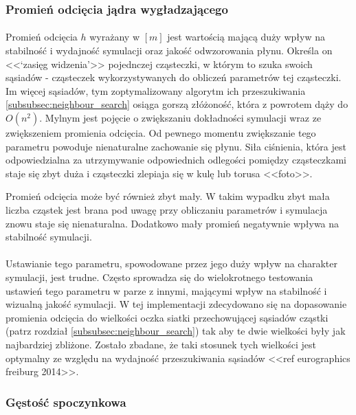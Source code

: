 \subsubsection{Promień odcięcia jądra wygładzającego}

\paragraph{}
Promień odcięcia $h$ wyrażany w $[m]$ jest wartością mającą duży wpływ na stabilność i wydajność symulacji oraz jakość odwzorowania płynu. Określa on <<`zasięg widzenia'>> pojednczej cząsteczki, w którym to szuka swoich sąsiadów - cząsteczek wykorzystywanych do obliczeń parametrów tej cząsteczki. Im więcej sąsiadów, tym zoptymalizowany algorytm ich przeszukiwania \eqref{subsubsec:neighbour_search} osiąga gorszą złóżoność, która z powrotem dąży do $O(n^2)$. Mylnym jest pojęcie o zwiększaniu dokładności symulacji wraz ze zwiększeniem promienia odcięcia. Od pewnego momentu zwiększanie tego parametru powoduje nienaturalne zachowanie się płynu. Siła ciśnienia, która jest odpowiedzialna za utrzymywanie odpowiednich odlegości pomiędzy cząsteczkami staje się zbyt duża i cząsteczki zlepiaja się w kulę lub torusa <<foto>>.
\par Promień odcięcia może być również zbyt mały. W takim wypadku zbyt mała liczba cząstek jest brana pod uwagę przy obliczaniu parametrów i symulacja znowu staje się nienaturalna. Dodatkowo mały promień negatywnie wpływa na stabilność symulacji.
\par
\paragraph{}
Ustawianie tego parametru, spowodowane przez jego duży wpływ na charakter symulacji, jest trudne. Często sprowadza się do wielokrotnego testowania ustawień tego parametru w parze z innymi, mającymi wpływ na stabilność i wizualną jakość symulacji. W tej implementacji zdecydowano się na dopasowanie promienia odcięcia do wielkości oczka siatki przechowującej sąsiadów cząstki (patrz rozdział \eqref{subsubsec:neighbour_search}) tak aby te dwie wielkości były jak najbardziej zbliżone. Zostało zbadane, że taki stosunek tych wielkości jest optymalny ze względu na wydajność przeszukiwania sąsiadów <<ref eurographics freiburg 2014>>.
\par

\subsubsection{Gęstość spoczynkowa}

